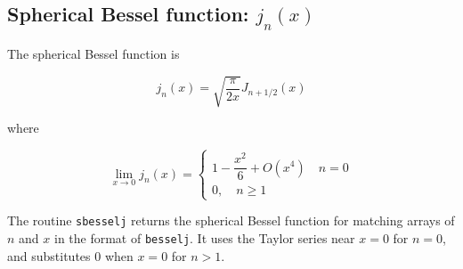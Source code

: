%
%
%
%
%
%

\subsection{Spherical Bessel function: $j_n(x)$}

The spherical Bessel function is 

\begin{equation}
j_n(x) = \sqrt{\dfrac{\pi}{2x}}J_{n+1/2}(x)
\end{equation}

\noindent where

\begin{equation}
\lim_{x\rightarrow0}j_n(x) = \left\{ \begin{array}{c} 1 - \dfrac{x^2}{6} + O(x^4) \quad n=0 \\ 0, \quad n \ge 1\end{array}  \right.
\end{equation}

The routine \texttt{sbesselj} returns the spherical Bessel function for matching arrays of $n$ and $x$ in the format of \texttt{besselj}. It uses the Taylor series near $x = 0$ for $n=0$, and substitutes 0 when $x=0$ for $n>1$.  

